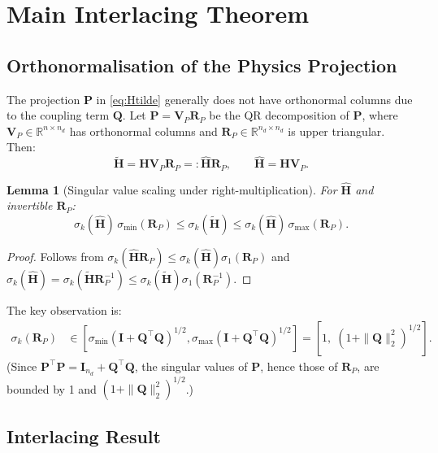 \documentclass[11pt,a4paper]{article}
\theoremstyle{plain}
\newtheorem{lemma}{Lemma}
\theoremstyle{definition}
\theoremstyle{remark}
\newcommand{\bfH}{\mathbf{H}}
\newcommand{\bfHt}{\tilde{\mathbf{H}}}
\newcommand{\bfP}{\mathbf{P}}
\newcommand{\bfQ}{\mathbf{Q}}
\newcommand{\bfR}{\mathbf{R}}
\newcommand{\bfV}{\mathbf{V}}
\newcommand{\bfI}{\mathbf{I}}
\newcommand{\sigmax}{\sigma_{\max}}
\newcommand{\sigmin}{\sigma_{\min}}
\newcommand{\norm}[1]{\|#1\|}
\begin{document}
\section{Main Interlacing Theorem}
\label{sec:main}

\subsection{Orthonormalisation of the Physics Projection}

The projection $\bfP$ in \eqref{eq:Htilde} generally does not have
orthonormal columns due to the coupling term $\bfQ$.  Let
$\bfP = \bfV_P\bfR_P$ be the QR decomposition of $\bfP$, where
$\bfV_P \in \mathbb{R}^{n \times n_d}$ has orthonormal columns and
$\bfR_P \in \mathbb{R}^{n_d \times n_d}$ is upper triangular.
Then:
\begin{equation}
  \bfHt = \bfH\bfV_P\bfR_P =: \hat{\bfH}\bfR_P,
  \qquad \hat{\bfH} = \bfH\bfV_P.
  \label{eq:Hhat}
\end{equation}

\begin{lemma}[Singular value scaling under right-multiplication]
\label{lem:scale}
For $\hat{\bfH}$ and invertible $\bfR_P$:
\begin{equation}
  \sigma_k(\hat{\bfH})\,\sigmin(\bfR_P) \leq
  \sigma_k(\bfHt) \leq
  \sigma_k(\hat{\bfH})\,\sigmax(\bfR_P).
  \label{eq:scale}
\end{equation}
\end{lemma}
\begin{proof}
Follows from $\sigma_k(\hat{\bfH}\bfR_P) \leq \sigma_k(\hat{\bfH})\sigma_1(\bfR_P)$
and $\sigma_k(\hat{\bfH}) = \sigma_k(\bfHt\bfR_P^{-1}) \leq
\sigma_k(\bfHt)\sigma_1(\bfR_P^{-1})$.
\end{proof}

The key observation is:
\begin{align}
  \sigma_k(\bfR_P) &\in [\sigmin(\bfI + \bfQ^\top\bfQ)^{1/2},
                          \sigmax(\bfI + \bfQ^\top\bfQ)^{1/2}]
  = [1,\; (1+\norm{\bfQ}_2^2)^{1/2}].
  \label{eq:Rscale}
\end{align}
(Since $\bfP^\top\bfP = \bfI_{n_d} + \bfQ^\top\bfQ$, the singular
values of $\bfP$, hence those of $\bfR_P$, are bounded by 1 and
$(1+\norm{\bfQ}_2^2)^{1/2}$.)

\subsection{Interlacing Result}
\end{document}
